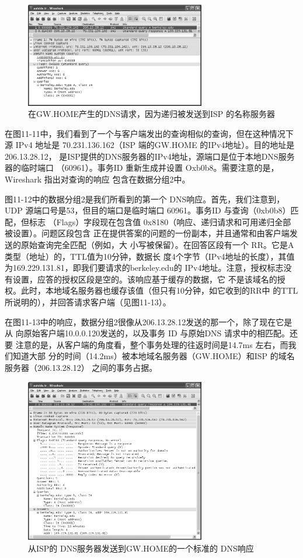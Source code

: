 \begin{figure}[!htb]
    \centering
	\includegraphics[width=0.7\textwidth]{imgs/11/11-11.png}
	\caption{在GW.HOME产生的DNS请求，因为递归被发送到ISP 的名称服务器}
\end{figure}

在图11-11中，我们看到了一个与客户端发出的查询相似的查询，但在这种情况下源
IPv4 地址是 70.231.136.162（ISP 端的GW.HOME 的IPv4地址）。目的地址是206.13.28.12，
是ISP提供的DNS服务器的IPv4地址，源端口是位于本地DNS服务器的临时端口
（60961）。事务ID 重新生成并设置 Oxb0b8。需要注意的是，Wireshark 指出对查询的响应
包含在数据分组2中。

图11-12中的数据分组2是我们所看到的第一个 DNS响应。首先，我们注意到，UDP
源端口号是53，但目的端口是临时端口 60961。事务ID 与查询（0xb0b8）匹配，但标志
（Flags）字段现在包含值 0x8180（响应、递归请求和可用递归全部被设置）。问题区段包含
正在提供答案的问题的一份副本，并且通常和由客户端发送的原始查询完全匹配（例如，大
小写被保留）。在回答区段有一个 RR。它是A类型（地址）的，TTL值为10分钟，数据长
度4个字节（IPv4地址的长度），其值为169.229.131.81，即我们要请求的berkeley.edu的
IPv4地址。注意，授权标志没有设置，应答的授权区段是空的。该响应基于缓存的数据，它
不是该域名的授权。此时，本地域名服务器也缓存该值（但只有10分钟，如它收到的RR中
的TTL 所说明的），并回答请求客户端（见图11-13）。

在图11-13中的响应，数据分组2很像从206.13.28.12发送的那一个，除了现在它是从
向原始客户端10.0.0.120发送的，以及事务 ID 与原始DNS 请求中的相匹配。还要
注意的是，从客户端的角度看，整个事务处理的往返时间是14.7ms 左右，而我们知道大部
分的时间（14.2ms）被本地域名服务器（GW.HOME）和ISP 的域名服务器（206.13.28.12）
之间的事务占据。

\begin{figure}[!htb]
    \centering
	\includegraphics[width=0.7\textwidth]{imgs/11/11-12.png}
	\caption{从ISP的 DNS服务器发送到GW.HOME的一个标准的 DNS响应}
\end{figure}

